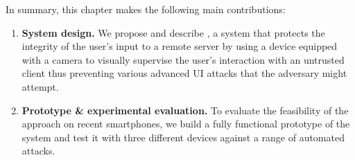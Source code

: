 In summary, this chapter makes the following main contributions:
\begin{enumerate}
	\item \textbf{System design.}
	We propose and describe \sysname, a system that protects the integrity of the user's input to a remote server by using a device equipped with a camera to visually supervise the user's interaction with an untrusted client thus preventing various advanced UI attacks that the adversary might attempt.


	\item \textbf{Prototype \& experimental evaluation.}
	To evaluate the feasibility of the approach on recent smartphones, we build a fully functional prototype of the \sysname system and test it with three different devices against a range of automated attacks.

\end{enumerate}
